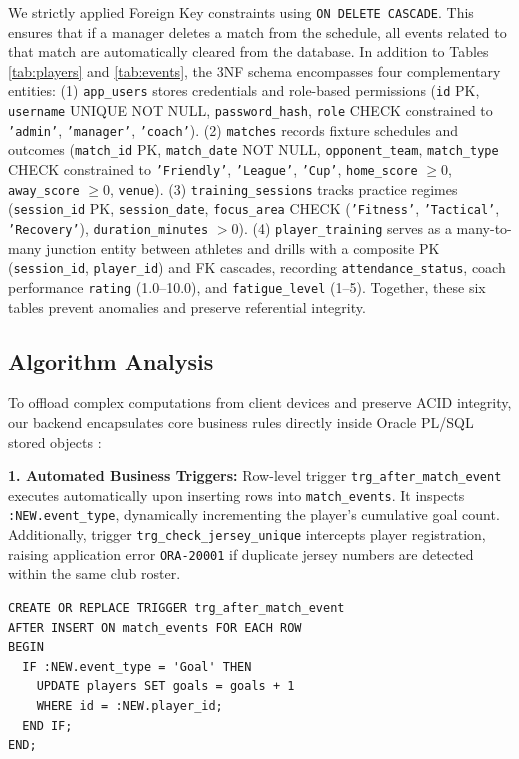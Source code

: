 \documentclass[fonts]{icst}
\begin{document}
We strictly applied Foreign Key constraints using \texttt{ON DELETE CASCADE}. This ensures that if a manager deletes a match from the schedule, all events related to that match are automatically cleared from the database.
In addition to Tables \ref{tab:players} and \ref{tab:events}, the 3NF schema encompasses four complementary entities:
(1) \texttt{app\_users} stores credentials and role-based permissions (\texttt{id} PK, \texttt{username} UNIQUE NOT NULL, \texttt{password\_hash}, \texttt{role} CHECK constrained to \texttt{'admin'}, \texttt{'manager'}, \texttt{'coach'}).
(2) \texttt{matches} records fixture schedules and outcomes (\texttt{match\_id} PK, \texttt{match\_date} NOT NULL, \texttt{opponent\_team}, \texttt{match\_type} CHECK constrained to \texttt{'Friendly'}, \texttt{'League'}, \texttt{'Cup'}, \texttt{home\_score} $\ge 0$, \texttt{away\_score} $\ge 0$, \texttt{venue}).
(3) \texttt{training\_sessions} tracks practice regimes (\texttt{session\_id} PK, \texttt{session\_date}, \texttt{focus\_area} CHECK (\texttt{'Fitness'}, \texttt{'Tactical'}, \texttt{'Recovery'}), \texttt{duration\_minutes} $> 0$).
(4) \texttt{player\_training} serves as a many-to-many junction entity between athletes and drills with a composite PK (\texttt{session\_id}, \texttt{player\_id}) and FK cascades, recording \texttt{attendance\_status}, coach performance \texttt{rating} (1.0--10.0), and \texttt{fatigue\_level} (1--5). Together, these six tables prevent anomalies and preserve referential integrity.

\subsection{Algorithm Analysis}
To offload complex computations from client devices and preserve ACID integrity, our backend encapsulates core business rules directly inside Oracle PL/SQL stored objects \cite{oracle_plsql_guide}:

\textbf{1. Automated Business Triggers:}
Row-level trigger \texttt{trg\_after\_match\_event} executes automatically upon inserting rows into \texttt{match\_events}. It inspects \texttt{:NEW.event\_type}, dynamically incrementing the player's cumulative goal count. Additionally, trigger \texttt{trg\_check\_jersey\_unique} intercepts player registration, raising application error \texttt{ORA-20001} if duplicate jersey numbers are detected within the same club roster.
\begin{verbatim}
CREATE OR REPLACE TRIGGER trg_after_match_event
AFTER INSERT ON match_events FOR EACH ROW
BEGIN
  IF :NEW.event_type = 'Goal' THEN
    UPDATE players SET goals = goals + 1 
    WHERE id = :NEW.player_id;
  END IF;
END;
\end{verbatim}
\end{document}
